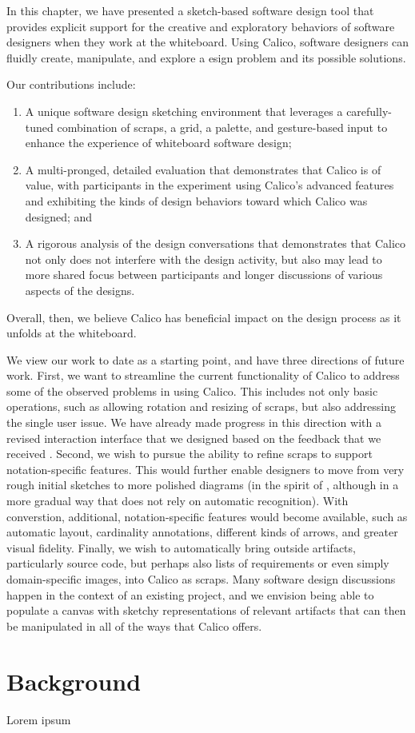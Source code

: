 In this chapter, we have presented a sketch-based software design tool that provides explicit support for the creative and exploratory behaviors of software designers when they work at the whiteboard. Using Calico, software designers can fluidly create, manipulate, and explore a esign problem and its possible solutions. 

Our contributions include: 
\begin{enumerate}

\item A unique software design sketching environment that leverages a carefully-tuned combination of scraps, a grid, a palette, and gesture-based input to enhance the experience of whiteboard software design; 
\item A multi-pronged, detailed evaluation that demonstrates that Calico is of value, with participants in the experiment using Calico's advanced features and exhibiting the kinds of design behaviors toward which Calico was designed; and 
\item A rigorous analysis of the design conversations that demonstrates that Calico not only does not interfere with the design activity, but also may lead to more shared focus between participants and longer discussions of various aspects of the designs.

\end{enumerate}
Overall, then, we believe Calico has beneficial impact on the design process as it unfolds at the whiteboard. 

We view our work to date as a starting point, and have three directions of future work. First, we want to streamline the current functionality of Calico to address some of the observed problems in using Calico. This includes not only basic operations, such as allowing rotation and resizing of scraps, but also addressing the single user issue. We have already made progress in this direction with a revised interaction interface that we designed based on the feedback that we received \citep{Mangano2}.  Second, we wish to pursue the ability to refine scraps to support notation-specific features.  This would further enable designers to move from very rough initial sketches to more polished diagrams (in the spirit of \citep{Plimmer2}, although in a more gradual way that does not rely on automatic recognition). With converstion, additional, notation-specific features would become available, such as automatic layout, cardinality annotations, different kinds of arrows, and greater visual fidelity. Finally, we wish to automatically bring outside artifacts, particularly source code, but perhaps also lists of requirements or even simply domain-specific images, into Calico as scraps. Many software design discussions happen in the context of an existing project, and we envision being able to populate a canvas with sketchy representations of relevant artifacts that can then be manipulated in all of the ways that Calico offers.


\section{Background}

Lorem ipsum


